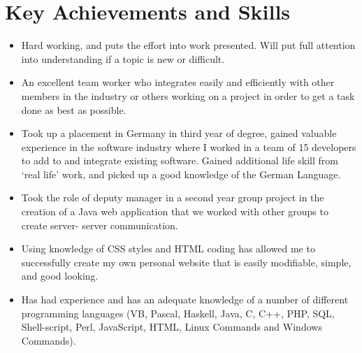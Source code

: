 \documentclass[a4paper,10pt]{article}
\begin{document}
\section{Key Achievements and Skills}
\begin{itemize}
\item Hard working, and puts the effort into work presented. Will put full attention into understanding if a topic is new or difficult.
\item An excellent team worker who integrates easily and efficiently with other members in the industry or others working on a project in order to get a task done as best as possible.
\item Took up a placement in Germany in third year of degree, gained valuable experience in the software industry where I worked in a team of 15 developers to add to and integrate existing software. Gained additional life skill from ‘real life’ work, and picked up a good knowledge of the German Language.
\item Took the role of deputy manager in a second year group project in the creation of a Java web application that we worked with other groups to create server- server communication.
\item Using knowledge of CSS styles and HTML coding has allowed me to successfully create my own personal website that is easily modifiable, simple, and good looking.
\item Has had experience and has an adequate knowledge of a number of different programming languages (VB, Pascal, Haskell, Java, C, C++, PHP, SQL, Shell-script, Perl, JavaScript, HTML, Linux Commands and Windows Commands).
\end{itemize}

\end{document}
